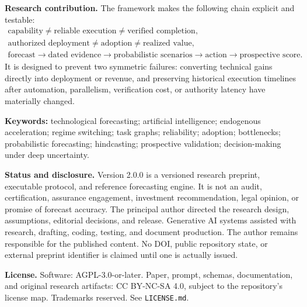 \begin{keybox}
\textbf{Research contribution.} The framework makes the following chain explicit and testable:
\[
\begin{gathered}
\text{capability}\neq\text{reliable execution}\neq\text{verified completion},\\[0.15em]
\text{authorized deployment}\neq\text{adoption}\neq\text{realized value},\\[0.2em]
\text{forecast}\rightarrow\text{dated evidence}\rightarrow\text{probabilistic scenarios}\rightarrow\text{action}\rightarrow\text{prospective score}.
\end{gathered}
\]
It is designed to prevent two symmetric failures: converting technical gains directly into deployment or revenue, and preserving historical execution timelines after automation, parallelism, verification cost, or authority latency have materially changed.
\end{keybox}

\textbf{Keywords:} technological forecasting; artificial intelligence; endogenous acceleration; regime switching; task graphs; reliability; adoption; bottlenecks; probabilistic forecasting; hindcasting; prospective validation; decision-making under deep uncertainty.

\textbf{Status and disclosure.} Version 2.0.0 is a versioned research preprint, executable protocol, and reference forecasting engine. It is not an audit, certification, assurance engagement, investment recommendation, legal opinion, or promise of forecast accuracy. The principal author directed the research design, assumptions, editorial decisions, and release. Generative AI systems assisted with research, drafting, coding, testing, and document production. The author remains responsible for the published content. No DOI, public repository state, or external preprint identifier is claimed until one is actually issued.

\textbf{License.} Software: AGPL-3.0-or-later. Paper, prompt, schemas, documentation, and original research artifacts: CC BY-NC-SA 4.0, subject to the repository's license map. Trademarks reserved. See \texttt{LICENSE.md}.
